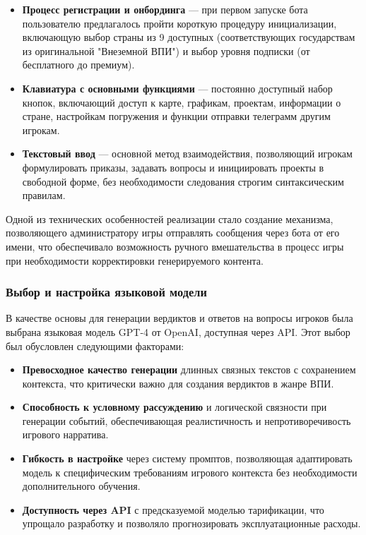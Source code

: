 \begin{itemize}
    \item \textbf{Процесс регистрации и онбординга} — при первом запуске бота пользователю предлагалось пройти короткую процедуру инициализации, включающую выбор страны из 9 доступных (соответствующих государствам из оригинальной "{}Внеземной ВПИ"{}) и выбор уровня подписки (от бесплатного до премиум).

    \item \textbf{Клавиатура с основными функциями} — постоянно доступный набор кнопок, включающий доступ к карте, графикам, проектам, информации о стране, настройкам погружения и функции отправки телеграмм другим игрокам.

    \item \textbf{Текстовый ввод} — основной метод взаимодействия, позволяющий игрокам формулировать приказы, задавать вопросы и инициировать проекты в свободной форме, без необходимости следования строгим синтаксическим правилам.
\end{itemize}

Одной из технических особенностей реализации стало создание механизма, позволяющего администратору игры отправлять сообщения через бота от его имени, что обеспечивало возможность ручного вмешательства в процесс игры при необходимости корректировки генерируемого контента.

\subsubsection{Выбор и настройка языковой модели}

В качестве основы для генерации вердиктов и ответов на вопросы игроков была выбрана языковая модель GPT-4 от OpenAI, доступная через API. Этот выбор был обусловлен следующими факторами:

\begin{itemize}
    \item \textbf{Превосходное качество генерации} длинных связных текстов с сохранением контекста, что критически важно для создания вердиктов в жанре ВПИ.

    \item \textbf{Способность к условному рассуждению} и логической связности при генерации событий, обеспечивающая реалистичность и непротиворечивость игрового нарратива.

    \item \textbf{Гибкость в настройке} через систему промптов, позволяющая адаптировать модель к специфическим требованиям игрового контекста без необходимости дополнительного обучения.

    \item \textbf{Доступность через API} с предсказуемой моделью тарификации, что упрощало разработку и позволяло прогнозировать эксплуатационные расходы.
\end{itemize}

